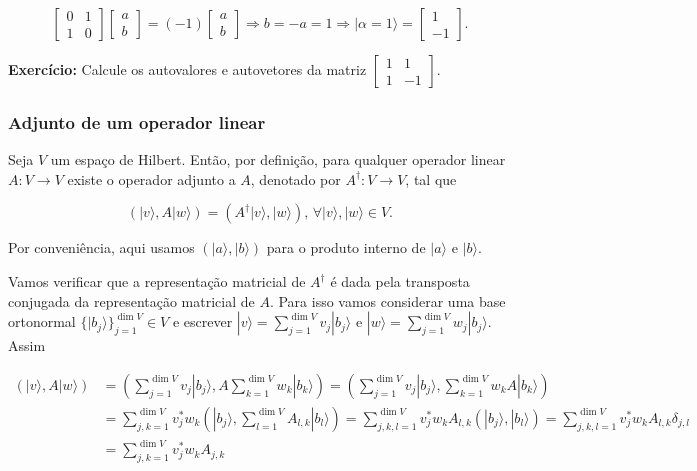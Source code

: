 \documentclass[11pt]{article}
\begin{document}
\begin{equation}
\begin{bmatrix}0&1\\1&0\end{bmatrix}\begin{bmatrix}a\\b\end{bmatrix}=(-1)\begin{bmatrix}a\\b\end{bmatrix}\Rightarrow b=-a=1\Rightarrow |\alpha=1\rangle = \begin{bmatrix}1\\-1\end{bmatrix}.
\end{equation}

\textbf{Exercício:} Calcule os autovalores e autovetores da matriz
\(\begin{bmatrix}1 & 1 \\ 1 & -1 \end{bmatrix}\).

    \subsubsection{Adjunto de um operador
linear}\label{adjunto-de-um-operador-linear}

Seja \(V\) um espaço de Hilbert. Então, por definição, para qualquer
operador linear \(A:V\rightarrow V\) existe o operador adjunto a \(A\),
denotado por \(A^{\dagger}:V\rightarrow V\), tal que

\begin{equation}
(|v\rangle,A|w\rangle) = (A^{\dagger}|v\rangle,|w\rangle)\text{, }\forall|v\rangle,|w\rangle\in V.
\end{equation}

Por conveniência, aqui usamos \((|a\rangle,|b\rangle)\) para o produto
interno de \(|a\rangle\) e \(|b\rangle\).

Vamos verificar que a representação matricial de \(A^{\dagger}\) é dada
pela transposta conjugada da representação matricial de \(A\). Para isso
vamos considerar uma base ortonormal
\(\{|b_{j}\rangle\}_{j=1}^{\dim V}\in V\) e escrever
\(|v\rangle = \sum_{j=1}^{\dim V}v_{j}|b_{j}\rangle\) e
\(|w\rangle = \sum_{j=1}^{\dim V}w_{j}|b_{j}\rangle\). Assim

\begin{align}
(|v\rangle,A|w\rangle) & = (\sum_{j=1}^{\dim V}v_{j}|b_{j}\rangle,A\sum_{k=1}^{\dim V}w_{k}|b_{k}\rangle) = (\sum_{j=1}^{\dim V}v_{j}|b_{j}\rangle,\sum_{k=1}^{\dim V}w_{k}A|b_{k}\rangle) \\ 
& = \sum_{j,k=1}^{\dim V}v^{*}_{j}w_{k}(|b_{j}\rangle,\sum_{l=1}^{\dim V}A_{l,k}|b_{l}\rangle) = \sum_{j,k,l=1}^{\dim V}v^{*}_{j}w_{k}A_{l,k}(|b_{j}\rangle,|b_{l}\rangle) = \sum_{j,k,l=1}^{\dim V}v^{*}_{j}w_{k}A_{l,k}\delta_{j,l} \\ 
& = \sum_{j,k=1}^{\dim V}v^{*}_{j}w_{k}A_{j,k}
\end{align}
\end{document}
